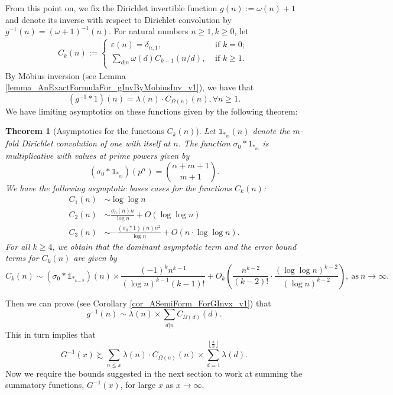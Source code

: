 \documentclass[11pt,reqno,a4letter]{article}
\numberwithin{figure}{section}
\numberwithin{table}{section}
\newcommand{\Floor}[2]{\ensuremath{\left\lfloor \frac{#1}{#2} \right\rfloor}}
\theoremstyle{plain}
\newtheorem{theorem}{Theorem}
\numberwithin{theorem}{section}
\theoremstyle{definition}
\begin{document}
From this point on, we fix the Dirichlet invertible function $g(n) := \omega(n) + 1$ and denote its 
inverse with respect to Dirichlet convolution by $g^{-1}(n) = (\omega+1)^{-1}(n)$. 
For natural numbers $n \geq 1, k \geq 0$, let 
\begin{align*} 
C_k(n) := \begin{cases} 
     \varepsilon(n) = \delta_{n,1}, & \text{ if $k = 0$; } \\ 
     \sum\limits_{d|n} \omega(d) C_{k-1}(n/d), & \text{ if $k \geq 1$. } 
     \end{cases} 
\end{align*} 
By M\"obius inversion (see Lemma \ref{lemma_AnExactFormulaFor_gInvByMobiusInv_v1}), 
we have that 
\[
(g^{-1} \ast 1)(n) = \lambda(n) \cdot C_{\Omega(n)}(n), \forall n \geq 1. 
\]
We have limiting asymptotics on these functions given by the following theorem: 

\begin{theorem}[Asymptotics for the functions $C_k(n)$] 
\label{theorem_Ckn_GeneralAsymptoticsForms} 
Let $\mathds{1}_{\ast_m}(n)$ denote the $m$-fold Dirichlet convolution of one with itself at $n$. 
The function $\sigma_0 \ast 1_{\ast_m}$ is multiplicative with values at prime powers 
given by 
\[
(\sigma_0 \ast \mathds{1}_{\ast_m})(p^{\alpha}) = \binom{\alpha+m+1}{m+1}. 
\]
We have the following asymptotic bases cases for the functions $C_k(n)$: 
\begin{align*} 
C_1(n) & \sim \log\log n \\ 
C_2(n) & \sim \frac{\sigma_0(n) n}{\log n} + O(\log\log n) \\ 
C_3(n) & \sim -\frac{(\sigma_0 \ast 1)(n) n^2}{\log n} + 
     O\left(n \cdot \log\log n\right). 
\end{align*} 
For all $k \geq 4$, we obtain that the dominant asymptotic term and the error bound terms for 
$C_k(n)$ are given by 
\[
C_k(n) \sim (\sigma_0 \ast \mathds{1}_{\ast_{k-2}})(n) \times \frac{(-1)^{k} n^{k-1}}{(\log n)^{k-1} (k-1)!} + 
     O_k\left(\frac{n^{k-2}}{(k-2)!} \cdot \frac{(\log\log n)^{k-2}}{(\log n)^{k-2}}\right), 
     \mathrm{\ as\ }n \rightarrow \infty. 
\]
\end{theorem} 

Then we can prove (see Corollary \ref{cor_ASemiForm_ForGInvx_v1}) that 
\[
g^{-1}(n) \sim \lambda(n) \times \sum_{d|n} C_{\Omega(d)}(d). 
\]
This in turn implies that 
\[
G^{-1}(x) \succsim \sum_{n \leq x} \lambda(n) \cdot C_{\Omega(n)}(n) \times 
     \sum_{d=1}^{\Floor{x}{n}} \lambda(d). 
\]
Now we require the bounds suggested in the next section to work at summing the 
summatory functions, $G^{-1}(x)$, for large $x$ as $x \rightarrow \infty$. 
\end{document}
